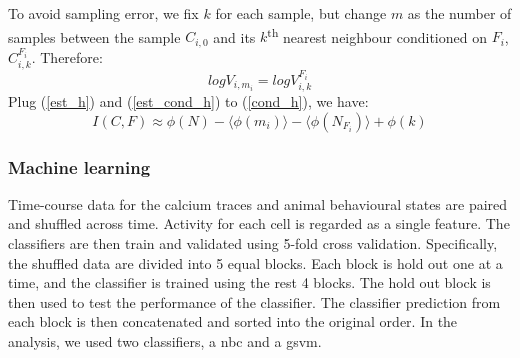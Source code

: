 To avoid sampling error, we fix $k$ for each sample, but change $m$ as the number of samples between the sample $C_{i,0}$ and its $k$\textsuperscript{th} nearest neighbour conditioned on $F_i$, $C_{i,k}^{F_i}$. Therefore:
\begin{equation*}
logV_{i, m_i} = logV_{i, k}^{F_i} 
\end{equation*}
Plug (\ref{est_h}) and (\ref{est_cond_h}) to (\ref{cond_h}), we have:
\begin{equation*}
    I(C, F) \approx \phi(N) - \langle\phi(m_i)\rangle - \langle\phi(N_{F_i})\rangle + \phi(k)
\end{equation*}




\subsubsection{Machine learning}

Time-course data for the calcium traces and animal behavioural states are paired and shuffled across time. Activity for each cell is regarded as a single feature. The classifiers are then train and validated using 5-fold cross validation. Specifically, the shuffled data are divided into 5 equal blocks. Each block is hold out one at a time, and the classifier is trained using the rest 4 blocks. The hold out block is then used to test the performance of the classifier. The classifier prediction from each block is then concatenated and sorted into the original order. In the analysis, we used two classifiers, a \gls{nbc} and a \gls{gsvm}. 

